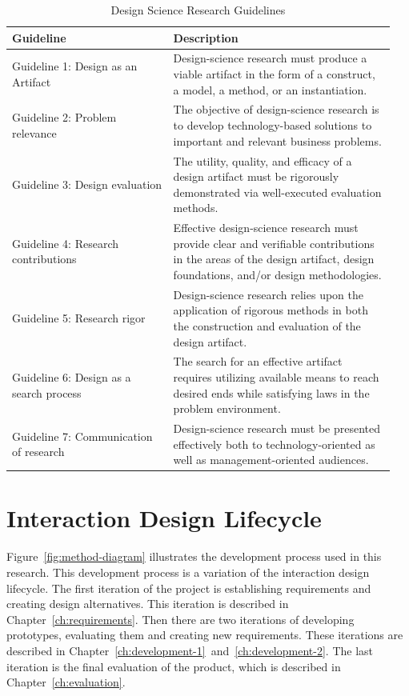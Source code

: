 \documentclass[../Main/thesis.tex]{subfiles}
\begin{document}
\begin{table}[h]
\centering
\caption[Design Science Research Guidelines]{Design Science Research Guidelines \citep[p.83]{hevner2004design}}
\begin{tabular}{|p{0.4\linewidth}|p{0.55\linewidth}|}
	\hline
	\textbf{Guideline} & \textbf{Description} \\ \hline
	Guideline 1: Design as an Artifact & Design-science research must produce a viable artifact in the form of a construct, a model, a method, or an instantiation. \\ \hline
	Guideline 2: Problem relevance & The objective of design-science research is to develop technology-based solutions to important and relevant business problems. \\ \hline
	Guideline 3: Design evaluation & The utility, quality, and efficacy of a design artifact must be rigorously demonstrated via well-executed evaluation methods. \\ \hline
	Guideline 4: Research contributions & Effective design-science research must provide clear and verifiable contributions in the areas of the design artifact, design foundations, and/or design methodologies. \\ \hline
	Guideline 5: Research rigor & Design-science research relies upon the application of rigorous methods in both the construction and evaluation of the design artifact. \\ \hline
	Guideline 6: Design as a search process & The search for an effective artifact requires utilizing available means to reach desired ends while satisfying laws in the problem environment. \\ \hline
	Guideline 7: Communication of research & Design-science research must be presented effectively both to technology-oriented as well as management-oriented audiences. \\ \hline
\end{tabular}
\label{tab:design-science-guidelines}
\end{table}

\section{Interaction Design Lifecycle}
Figure~\ref{fig:method-diagram} illustrates the development process used in this research.
This development process is a variation of the interaction design lifecycle.
The first iteration of the project is establishing requirements and creating design alternatives.
This iteration is described in Chapter~\ref{ch:requirements}.
Then there are two iterations of developing prototypes, evaluating them and creating new requirements.
These iterations are described in Chapter~\ref{ch:development-1}~and~\ref{ch:development-2}.
The last iteration is the final evaluation of the product, which is described in Chapter~\ref{ch:evaluation}.
\newpage
\end{document}
